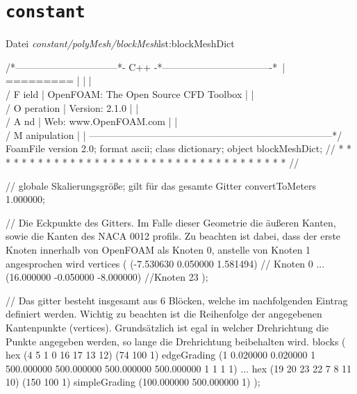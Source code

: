 \chapter{\texttt{constant}}

\begin{dict}{Datei \textit{constant/polyMesh/blockMesh}}{lst:blockMeshDict}

/*--------------------------------*- C++ -*----------------------------------*\ 
| =========                 |                                                 | 
| \\      /  F ield         | OpenFOAM: The Open Source CFD Toolbox           | 
|  \\    /   O peration     | Version:  2.1.0                                 | 
|   \\  /    A nd           | Web:      www.OpenFOAM.com                      | 
|    \\/     M anipulation  |                                                 | 
\*---------------------------------------------------------------------------*/ 
FoamFile                                                                        
{                                                                               
    version     2.0;                                                            
    format      ascii;                                                          
    class       dictionary;                                                     
    object      blockMeshDict;                                                  
}                                                                               
// * * * * * * * * * * * * * * * * * * * * * * * * * * * * * * * * * * * * * // 

// globale Skalierungsgröße; gilt für das gesamte Gitter
convertToMeters 1.000000; 

// Die Eckpunkte des Gitters. Im Falle dieser Geometrie die äußeren Kanten, sowie die Kanten des NACA 0012 profils. Zu beachten ist dabei, dass der erste Knoten innerhalb von OpenFOAM als Knoten 0, anstelle von Knoten 1 angesprochen wird
vertices 
( 
    (-7.530630 0.050000 1.581494)		// Knoten 0
...
    (16.000000 -0.050000 -8.000000)		//Knoten 23
); 

// Das gitter besteht insgesamt aus 6 Blöcken, welche im nachfolgenden Eintrag definiert werden. Wichtig zu beachten ist die Reihenfolge der angegebenen Kantenpunkte (vertices). Grundsätzlich ist egal in welcher Drehrichtung die Punkte angegeben werden, so lange die Drehrichtung beibehalten wird.
blocks 
( 
    hex (4 5 1 0 16 17 13 12)     (74 100 1) edgeGrading (1 0.020000 0.020000 1 500.000000 500.000000 500.000000 500.000000 1 1 1 1) 
...
    hex (19 20 23 22 7 8 11 10)   (150 100 1) simpleGrading (100.000000 500.000000 1) 
); 


\end{dict}
